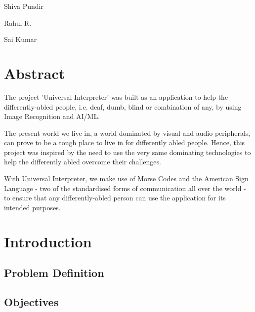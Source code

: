 \documentclass{article}
\begin{document}
		\hfill Shiva Pundir 

		\hfill Rahul R. 

		\hfill Sai Kumar 

	\newpage


	\section{Abstract}
		The project 'Universal Interpreter' was built as an application to help the differently-abled people, i.e. deaf, dumb, blind or combination of any, by using Image Recognition and AI/ML. \newline
		
		The present world we live in, a world dominated by visual and audio peripherals, can prove to be a tough place to live in for differently abled people. Hence, this project was inspired by the need to use the very same dominating technologies to help the differently abled overcome their challenges. \newline 

		With Universal Interpreter, we make use of Morse Codes and the American Sign Language - two of the standardised forms of communication all over the world - to ensure that any differently-abled person can use the application for its intended purposes.\newline 

	\newpage


	\tableofcontents

	\newpage


	\listoffigures

	\vfill

	\listoftables

	\newpage



	\section{Introduction}
		\subsection{Problem Definition}
		\subsection{Objectives}
\end{document}
